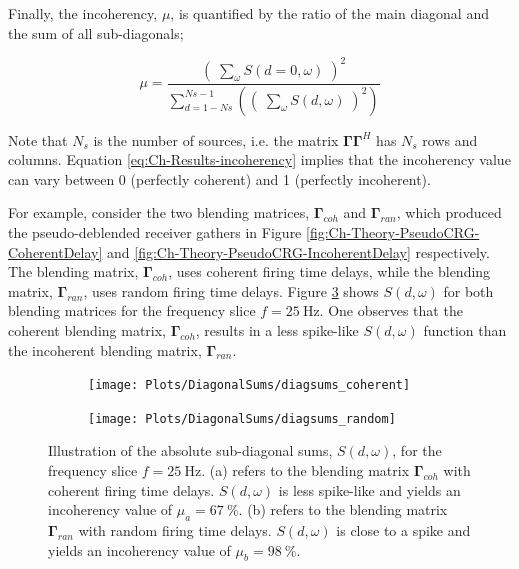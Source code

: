 Finally, the incoherency, $\mu$, is quantified by the ratio of the main diagonal and the sum of all sub-diagonals;

\begin{equation}
	\mu = \frac{\left( \; \sum_{\omega}S(d=0,\omega) \; \right)^2}{\sum_{d = 1-Ns}^{Ns-1} \left(\left( \; \sum_{\omega}S(d,\omega) \; \right)^2\right)}
	\label{eq:Ch-Results-incoherency}
\end{equation}

Note that $N_s$ is the number of sources, i.e. the matrix $\mathbf{\Gamma \Gamma}^H$ has $N_s$ rows and columns. Equation \ref{eq:Ch-Results-incoherency} implies that the incoherency value can vary between 0 (perfectly coherent) and 1 (perfectly incoherent).

For example, consider the two blending matrices, $\mathbf{\Gamma}_{coh}$ and $\mathbf{\Gamma}_{ran}$, which produced the pseudo-deblended receiver gathers in Figure \ref{fig:Ch-Theory-PseudoCRG-CoherentDelay} and \ref{fig:Ch-Theory-PseudoCRG-IncoherentDelay} respectively. The blending matrix, $\mathbf{\Gamma}_{coh}$, uses coherent firing time delays, while the blending matrix, $\mathbf{\Gamma}_{ran}$, uses random firing time delays. Figure \ref{fig:Ch-Incoherency-Coh-vs-Ran-Diag} shows $S(d,\omega)$ for both blending matrices for the frequency slice $f=\SI{25}{\hertz}$. One observes that the coherent blending matrix, $\mathbf{\Gamma}_{coh}$, results in a less spike-like $S(d,\omega)$ function than the incoherent blending matrix, $\mathbf{\Gamma}_{ran}$.

\begin{figure}
	
	\centering
	\begin{subfigure}[b]{0.45\textwidth}
	\centering
	\texttt{[image: Plots/DiagonalSums/diagsums\_coherent]}	
	\caption{}
	\label{fig:Ch-Incoherency-CoherentDiag}	
	\end{subfigure}
	\centering
	\begin{subfigure}[b]{0.45\textwidth}
	\centering
	\texttt{[image: Plots/DiagonalSums/diagsums\_random]}	
	\caption{}
	\label{fig:Ch-Incoherency-RandomDiag}	
	\end{subfigure}
	
	\caption{Illustration of the absolute sub-diagonal sums, $S(d,\omega)$, for the frequency slice $f=\SI{25}{\hertz}$. (a) refers to the blending matrix $\mathbf{\Gamma}_{coh}$ with coherent firing time delays.  $S(d,\omega)$ is less spike-like and yields an incoherency value of $\mu_a = \SI{67}{\percent}$. (b) refers to the blending matrix $\mathbf{\Gamma}_{ran}$ with random firing time delays. $S(d,\omega)$ is  close to a spike and yields an incoherency value of $\mu_b = \SI{98}{\percent}$.}
	\label{fig:Ch-Incoherency-Coh-vs-Ran-Diag}
	
\end{figure}


